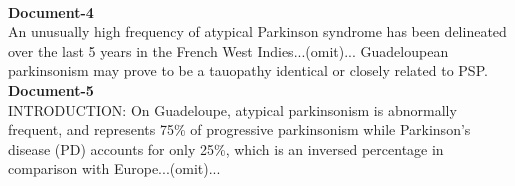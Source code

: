 \documentclass[10pt, a4paper, logo]{googledeepmind} %
\begin{document}
\begin{tcolorbox}
\begin{flushleft}
\\
\vspace{1em}
\textbf{Document-4}\\
An unusually high frequency of atypical Parkinson syndrome has been delineated over the last 5 years in the French West Indies...(omit)... 
Guadeloupean parkinsonism may prove to be a tauopathy identical or closely related to PSP.
\\
\vspace{1em}
\textbf{Document-5}\\
INTRODUCTION: On Guadeloupe, atypical parkinsonism is abnormally frequent, and represents 75\% of progressive parkinsonism while Parkinson's disease (PD) accounts for only 25\%, which is an inversed percentage in comparison with Europe...(omit)...

\end{flushleft}
\end{tcolorbox}
\end{document}
